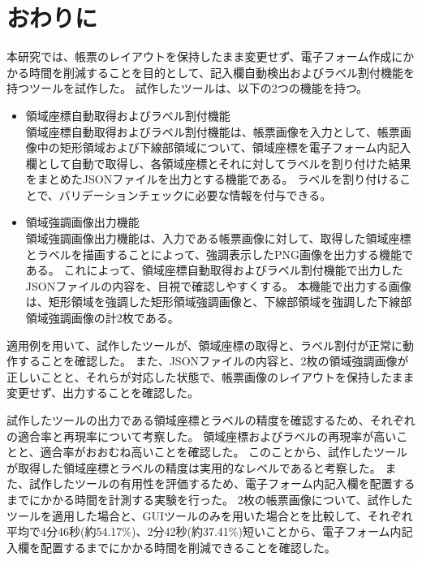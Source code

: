 \chapter{おわりに}\label{cha:Conclusion}
本研究では、帳票のレイアウトを保持したまま変更せず、電子フォーム作成にかかる時間を削減することを目的として、記入欄自動検出およびラベル割付機能を持つツールを試作した。
試作したツールは、以下の2つの機能を持つ。

\begin{itemize}
    \item 領域座標自動取得およびラベル割付機能\\
        領域座標自動取得およびラベル割付機能は、帳票画像を入力として、帳票画像中の矩形領域および下線部領域について、領域座標を電子フォーム内記入欄として自動で取得し、各領域座標とそれに対してラベルを割り付けた結果をまとめたJSONファイルを出力とする機能である。
        ラベルを割り付けることで、バリデーションチェックに必要な情報を付与できる。
    \item 領域強調画像出力機能\\
        領域強調画像出力機能は、入力である帳票画像に対して、取得した領域座標とラベルを描画することによって、強調表示したPNG画像を出力する機能である。
        これによって、領域座標自動取得およびラベル割付機能で出力したJSONファイルの内容を、目視で確認しやすくする。
        本機能で出力する画像は、矩形領域を強調した矩形領域強調画像と、下線部領域を強調した下線部領域強調画像の計2枚である。
\end{itemize}

適用例を用いて、試作したツールが、領域座標の取得と、ラベル割付が正常に動作することを確認した。
また、JSONファイルの内容と、2枚の領域強調画像が正しいことと、それらが対応した状態で、帳票画像のレイアウトを保持したまま変更せず、出力することを確認した。


試作したツールの出力である領域座標とラベルの精度を確認するため、それぞれの適合率と再現率について考察した。
領域座標およびラベルの再現率が高いことと、適合率がおおむね高いことを確認した。
このことから、試作したツールが取得した領域座標とラベルの精度は実用的なレベルであると考察した。
また、試作したツールの有用性を評価するため、電子フォーム内記入欄を配置するまでにかかる時間を計測する実験を行った。
2枚の帳票画像について、試作したツールを適用した場合と、GUIツールのみを用いた場合とを比較して、それぞれ平均で4分46秒(約54.17\%)、2分42秒(約37.41\%)短いことから、電子フォーム内記入欄を配置するまでにかかる時間を削減できることを確認した。

